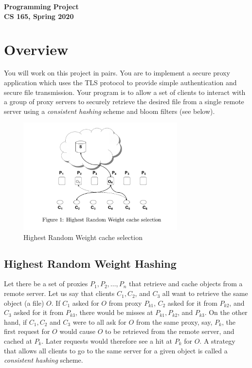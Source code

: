 \documentclass[11pt]{article}
\begin{document}
\begin{center}
{\Large\bf Programming Project\\
CS 165, Spring 2020\\}
\end{center}
\vspace{0.25in}

\section{Overview}
You will work on this project in pairs.  You are to implement a secure
proxy application which uses the TLS protocol to provide simple authentication
and secure file transmission. Your program is to allow a set of clients to
interact with a group of proxy servers to securely retrieve the desired file
from a single remote server using a \textit{consistent hashing} scheme and bloom filters (see
below).

\begin{figure}[h]
\begin{center}
\includegraphics[height=2.3in]{HRW.PNG}
\caption{Highest Random Weight cache selection\label{fig:hrw}}
\end{center}
\end{figure}

\subsection{Highest Random Weight Hashing}
Let there be a set of proxies $P_1, P_2,\ldots, P_n$ that retrieve and cache
objects from a remote server.  Let us say that clients $C_1, C_2$, and $C_3$
all want to retrieve the same object (a file) $O$.  If $C_1$ asked for $O$ from
proxy $P_{k1}$, $C_2$ asked for it from $P_{k2}$, and $C_3$ asked for it from
$P_{k3}$, there would be misses at $P_{k1}, P_{k2}$, and $P_{k3}$. On the other
hand, if $C_1, C_2$ and $C_3$ were to all ask for $O$ from the same proxy, say,
$P_k$, the first request for $O$ would cause $O$ to be retrieved from the
remote server, and cached at $P_k$. Later requests would therefore see a hit
at $P_k$ for $O$. A strategy that allows all clients to go to the same server
for a given object is called a \textit{consistent hashing} scheme.
\end{document}
